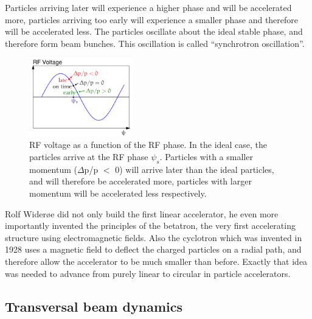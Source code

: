 Particles arriving later will experience a higher phase and will be accelerated more, particles arriving too early will experience a smaller phase and therefore will be accelerated less.
The particles oscillate about the ideal stable phase, and therefore form beam bunches.
This oscillation is called ``synchrotron oscillation''.
\begin{figure}
\centering
\includegraphics[width=0.4\textwidth]{Figures/RFphase.png}
\caption[Phase focusing]{RF voltage as a function of the RF phase. In the ideal case, the particles arrive at the RF phase $\psi_s$. 
Particles with a smaller momentum ($\Delta$p/p $<$ 0) will arrive later than the ideal particles, and will therefore be accelerated more, particles with larger momentum will be accelerated less respectively.}
\label{fig:RFPhase}
\end{figure}

Rolf Wider\o e did not only build the first linear accelerator, he even more importantly invented the principles of the betatron, the very first accelerating structure using electromagnetic fields.
Also the cyclotron which was invented in 1928 uses a magnetic field to deflect the charged particles on a radial path, and therefore allow the accelerator to be much smaller than before.
Exactly that idea was needed to advance from purely linear to circular in particle accelerators.

\subsection{Transversal beam dynamics}
\label{AccPhysics:Magnets}

